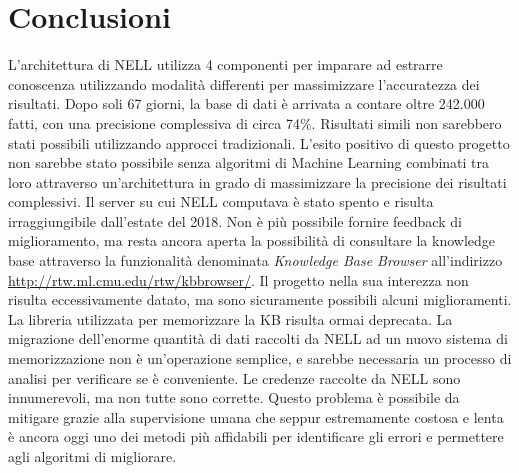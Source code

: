 \section*{Conclusioni}
L'architettura di NELL utilizza 4 componenti per imparare ad estrarre conoscenza utilizzando modalità differenti per massimizzare l'accuratezza dei risultati.
Dopo soli 67 giorni, la base di dati è arrivata a contare oltre 242.000 fatti, con una precisione complessiva di circa 74\%.\newline
Risultati simili non sarebbero stati possibili utilizzando approcci tradizionali. L'esito positivo di questo progetto non sarebbe stato possibile senza algoritmi di Machine Learning combinati tra loro attraverso un'architettura in grado di massimizzare la precisione dei risultati complessivi.\newline\newline
\noindent Il server su cui NELL computava è stato spento e risulta irraggiungibile dall'estate del 2018. Non è più possibile fornire feedback di miglioramento, ma resta ancora aperta la possibilità di consultare la knowledge base attraverso la funzionalità denominata \textit{Knowledge Base Browser} all'indirizzo \url{http://rtw.ml.cmu.edu/rtw/kbbrowser/}.\newline
\newline
Il progetto nella sua interezza non risulta eccessivamente datato, ma sono sicuramente possibili alcuni miglioramenti. La libreria utilizzata per memorizzare la KB risulta ormai deprecata. La migrazione dell'enorme quantità di dati raccolti da NELL ad un nuovo sistema di memorizzazione non è un'operazione semplice, e sarebbe necessaria un processo di analisi per verificare se è conveniente.\newline
Le credenze raccolte da NELL sono innumerevoli, ma non tutte sono corrette. Questo problema è possibile da mitigare grazie alla supervisione umana che seppur estremamente costosa e lenta è ancora oggi uno dei metodi più affidabili per identificare gli errori e permettere agli algoritmi di migliorare.
\newpage